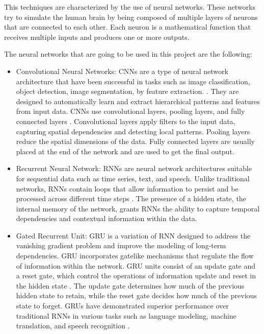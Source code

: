 This techniques are characterized by the use of neural networks. These networks try to simulate the human brain by being composed of multiple layers of neurons that are connected to each other. Each neuron is a mathematical function that receives multiple inputs and produces one or more outputs.

The neural networks that are going to be used in this project are the following:

\begin{itemize}
	\item Convolutional Neural Networks: CNNs are a type of neural network architecture that have been successful in tasks such as image classification, object detection, image segmentation, by feature extraction. \cite{valueva2020cnn}. They are designed to automatically learn and extract hierarchical patterns and features from input data. CNNs use convolutional layers, pooling layers, and fully connected layers \cite{taye2023layers}. Convolutional layers apply filters to the input data, capturing spatial dependencies and detecting local patterns. Pooling layers reduce the spatial dimensions of the data. Fully connected layers are usually placed at the end of the network and are used to get the final output.
	\item Recurrent Neural Network: RNNs are neural network architectures suitable for sequential data such as time series, text, and speech\cite{li2015rnn_structure}. Unlike traditional networks, RNNs contain loops that allow information to persist and be processed across different time steps \cite{dupond2019rnn}. The presence of a hidden state, the internal memory of the network, grants RNNs the ability to capture temporal dependencies and contextual information within the data.
	\item Gated Recurrent Unit: GRU is a variation of RNN designed to address the vanishing gradient problem and improve the modeling of long-term dependencies. GRU incorporates gatelike mechanisms that regulate the flow of information within the network. GRU units consist of an update gate and a reset gate, which control the operations of information update and reset in the hidden state \cite{cho2014gru}. The update gate determines how much of the previous hidden state to retain, while the reset gate decides how much of the previous state to forget. GRUs have demonstrated superior performance over traditional RNNs in various tasks such as language modeling, machine translation, and speech recognition \cite{ravanelli2018gruperformance}.
\end{itemize}

